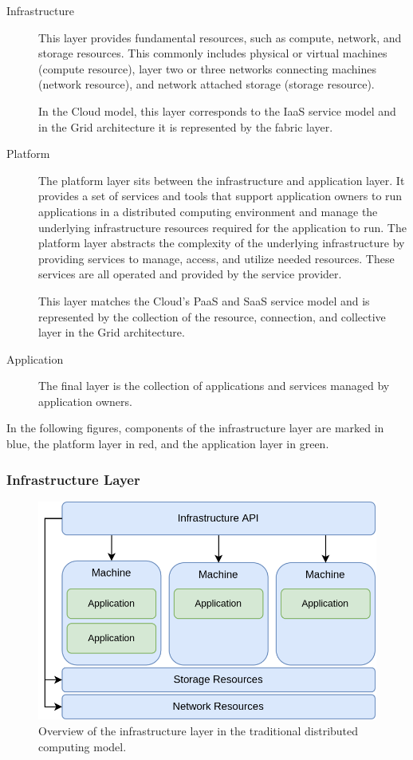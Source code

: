 \begin{description}
  \item[Infrastructure]
    This layer provides fundamental resources, such as compute, network, and
    storage resources. This commonly includes physical or virtual machines
    (compute resource), layer two or three networks connecting machines (network
    resource), and network attached storage (storage resource).

    In the Cloud model, this layer corresponds to the IaaS service model and in
    the Grid architecture it is represented by the fabric layer.
  \item[Platform]
    The platform layer sits between the infrastructure and application layer. It
    provides a set of services and tools that support application owners to run
    applications in a distributed computing environment and manage the
    underlying infrastructure resources required for the application to run. The
    platform layer abstracts the complexity of the underlying infrastructure by
    providing services to manage, access, and utilize needed resources. These
    services are all operated and provided by the service provider.

    This layer matches the Cloud's PaaS and SaaS service model and is
    represented by the collection of the resource, connection, and collective
    layer in the Grid architecture.
  \item[Application]
    The final layer is the collection of applications and services managed by
    application owners.
\end{description}

In the following figures, components of the infrastructure layer are marked in
blue, the platform layer in red, and the application layer in green.

\subsubsection{Infrastructure Layer}

\begin{figure}[H]
  \centering
  \includegraphics[width=0.6\linewidth]{resources/distributed-computing-infrastructure-example.drawio.png}
  \caption{Overview of the infrastructure layer in the traditional distributed computing model.}
  \label{fig:traditional-infrastructure-overview}
\end{figure}

